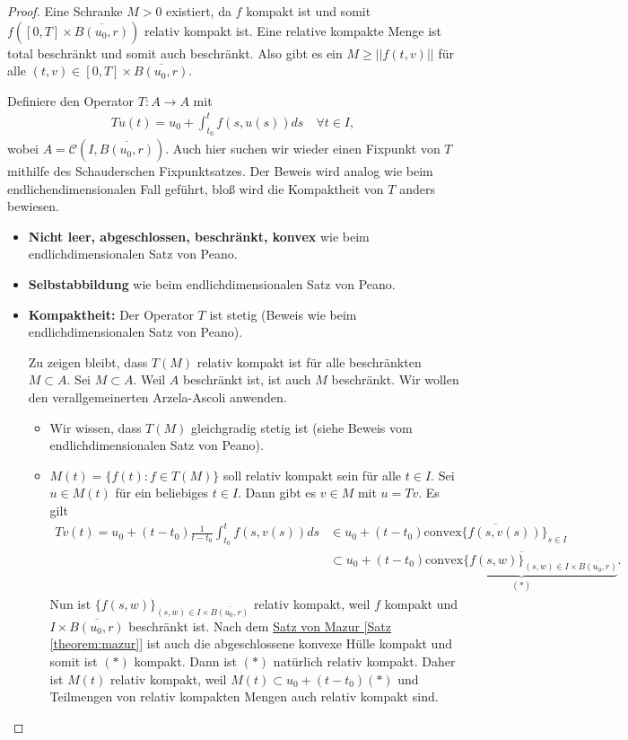 \documentclass[a4paper]{article}
\theoremstyle{definition}
\begin{document}
\begin{proof}
Eine Schranke $M > 0$ existiert, da $f$ kompakt ist und somit $f([0,T] \times \overline{B(u_0,r)})$ relativ kompakt ist. Eine relative kompakte Menge ist total beschränkt und somit auch beschränkt. Also gibt es ein $M \geq ||f(t,v)||$ für alle $(t,v) \in [0,T] \times \overline{B(u_0,r)}$.

Definiere den Operator $T:A \to A$ mit
\begin{align*}
    Tu(t) = u_0 + \int^t_{t_0} f(s,u(s)) ds \quad \forall t \in I,
\end{align*}
wobei $A = \mathcal{C}(I,\overline{ B(u_0,r)})$. Auch hier suchen wir wieder einen Fixpunkt von $T$ mithilfe des Schauderschen Fixpunktsatzes. Der Beweis wird analog wie beim endlichendimensionalen Fall geführt, bloß wird die Kompaktheit von $T$ anders bewiesen.

\begin{itemize}
    \item \textbf{Nicht leer, abgeschlossen, beschränkt, konvex} wie beim endlichdimensionalen Satz von Peano.
    \item \textbf{Selbstabbildung} wie beim endlichdimensionalen Satz von Peano.
    \item \textbf{Kompaktheit:} Der Operator $T$ ist stetig (Beweis wie beim endlichdimensionalen Satz von Peano).
    
    Zu zeigen bleibt, dass $T(M)$ relativ kompakt ist für alle beschränkten $M \subset A$. Sei $M \subset A$. Weil $A$ beschränkt ist, ist auch $M$ beschränkt. Wir wollen den verallgemeinerten Arzela-Ascoli anwenden.
    
    \begin{itemize}
        \item Wir wissen, dass $T(M)$ gleichgradig stetig ist (siehe Beweis vom endlichdimensionalen Satz von Peano). 

        \item $M(t) = \{ f(t) : f \in T(M) \}$ soll relativ kompakt sein für alle $t \in I$. Sei $u \in M(t)$ für ein beliebiges $t \in I$. Dann gibt es $v \in M$ mit $u = Tv$. Es gilt 
        \begin{align*}
            Tv(t) = u_0 + (t-t_0) \frac{1}{t-t_0}\int^t_{t_0}f(s, v(s)) ds &\in u_0 + (t-t_0) \overline{\mathrm{convex}\{ f(s, v(s)) \}_{s \in I}} \\
            &\subset u_0 + (t-t_0) \underbrace{\overline{\mathrm{convex}\{ f(s, w) \}_{(s,w) \in I \times \overline{B(u_0,r)}}}}_{(*)}.
        \end{align*}
        Nun ist $\{ f(s, w) \}_{(s,w) \in I \times \overline{B(u_0,r)}}$ relativ kompakt, weil $f$ kompakt und $I \times \overline{B(u_0,r)}$ beschränkt ist. Nach dem \hyperref[theorem:mazur]{Satz von Mazur [Satz \ref{theorem:mazur}]} ist auch die abgeschlossene konvexe Hülle kompakt und somit ist $(*)$ kompakt. Dann ist $(*)$ natürlich relativ kompakt. Daher ist $M(t)$ relativ kompakt, weil $M(t) \subset u_0 + (t-t_0)(*)$ und Teilmengen von relativ kompakten Mengen auch relativ kompakt sind.
    \end{itemize}


\end{itemize}
\end{proof}
\end{document}
